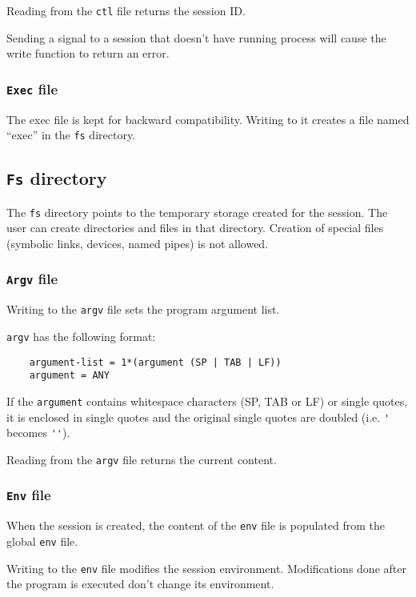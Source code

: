 \documentclass[draft]{article}
\begin{document}
Reading from the \verb|ctl| file returns the session ID. 

Sending a signal to a session that doesn't have running process will cause
the write function to return an error.

\subsubsection{{\tt Exec} file}

The exec file is kept for backward compatibility. Writing to it creates a
file named ``exec'' in the \verb|fs| directory.

\subsection{{\tt Fs} directory}

The \verb|fs| directory points to the temporary storage created for the
session. The user can create directories and files in that directory.
Creation of special files (symbolic links, devices, named pipes) is not
allowed. 

\subsubsection{{\tt Argv} file}

Writing to the \verb|argv| file sets the program argument list. 

\verb|argv| has the following format:

\begin{verbatim}
	argument-list = 1*(argument (SP | TAB | LF))
	argument = ANY
\end{verbatim}

If the \verb|argument| contains whitespace characters (SP, TAB or LF) or single
quotes, it is enclosed in single quotes and the original single quotes are
doubled (i.e. \verb|'| becomes \verb|''|).

Reading from the \verb|argv| file returns the current content.

\subsubsection{{\tt Env} file}

When the session is created, the content of the \verb|env| file is populated
from the global \verb|env| file.

Writing to the \verb|env| file modifies the session environment.
Modifications done after the program is executed don't change its
environment.
\end{document}
